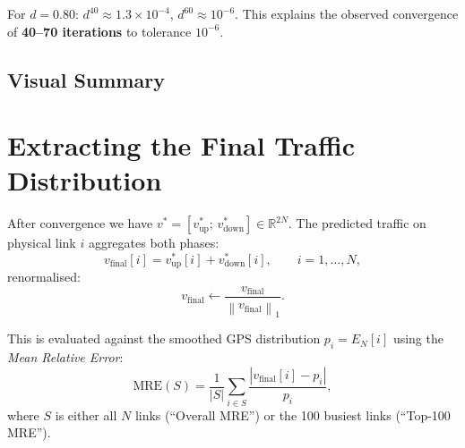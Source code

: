 \documentclass[12pt,a4paper]{article}
\theoremstyle{definition}
\theoremstyle{plain}
\newcommand{\vup}{v_{\mathrm{up}}}
\newcommand{\vdown}{v_{\mathrm{down}}}
\newcommand{\vf}{v_{\mathrm{final}}}
\newcommand{\norm}[1]{\left\|#1\right\|}
\begin{document}
For $d = 0.80$: $d^{40} \approx 1.3\times10^{-4}$, $d^{60} \approx 10^{-6}$. This
explains the observed convergence of \textbf{40--70 iterations} to tolerance $10^{-6}$.

\subsection{Visual Summary}

\begin{center}
\end{center}

\section{Extracting the Final Traffic Distribution}
\label{sec:extract}

After convergence we have $v^* = [\vup^*;\,\vdown^*] \in \mathbb{R}^{2N}$.
The predicted traffic on physical link $i$ aggregates both phases:
\begin{equation}
  \vf[i] = \vup^*[i] + \vdown^*[i], \qquad i = 1,\ldots,N,
\end{equation}
renormalised:
\begin{equation}
  \vf \leftarrow \frac{\vf}{\norm{\vf}_1}.
\end{equation}

This is evaluated against the smoothed GPS distribution $p_i = E_N[i]$ using the
\emph{Mean Relative Error}:
\begin{equation}
  \mathrm{MRE}(S) = \frac{1}{|S|}\sum_{i\in S}\frac{|\vf[i] - p_i|}{p_i},
\end{equation}
where $S$ is either all $N$ links (``Overall MRE'') or the 100 busiest links
(``Top-100 MRE'').
\end{document}
